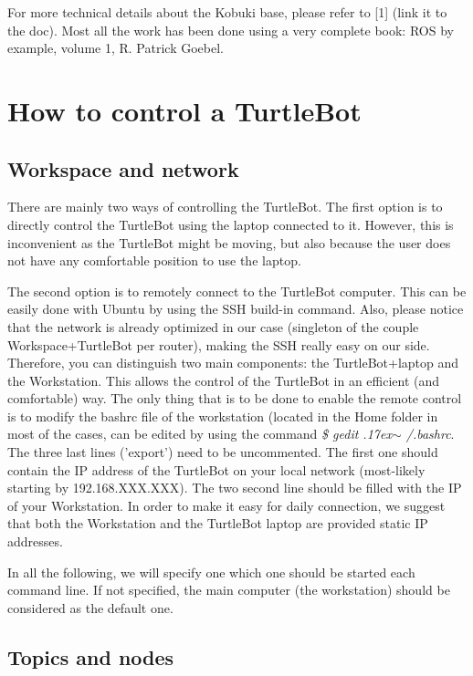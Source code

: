 \documentclass[aps,letterpaper,11pt]{revtex4}
\begin{document}
For more technical details about the Kobuki base, please refer to [1] (link it to the doc). Most all the work has been done using a very complete book: ROS by example, volume 1, R. Patrick Goebel.


\section{How to control a TurtleBot}
\subsection{Workspace and network}
There are mainly two ways of controlling the TurtleBot. 
The first option is to directly control the TurtleBot using the laptop connected to it. However, this is inconvenient as the TurtleBot might be moving, but also because the user does not have any comfortable position to use the laptop.

The second option is to remotely connect to the TurtleBot computer. This can be easily done with Ubuntu by using the SSH build-in command. Also, please notice that the network is already optimized in our case (singleton of the couple Workspace+TurtleBot per router), making the SSH really easy on our side. Therefore, you can distinguish two main components: the TurtleBot+laptop and the Workstation. This allows the control of the TurtleBot in an efficient (and comfortable) way. The only thing that is to be done to enable the remote control is to modify the bashrc file of the workstation (located in the Home folder in most of the cases, can be edited by using the command \textit{\$ gedit {\raise.17ex\hbox{$\scriptstyle\sim$}} /.bashrc}. The three last lines ('export') need to be uncommented. The first one should contain the IP address of the TurtleBot on your local network (most-likely starting by 192.168.XXX.XXX). The two second line should be filled with the IP of your Workstation. In order to make it easy for daily connection, we suggest that both the Workstation and the TurtleBot laptop are provided static IP addresses. 

In all the following, we will specify one which one should be started each command line. If not specified, the main computer (the workstation) should be considered as the default one.

\subsection{Topics and nodes}
\end{document}
